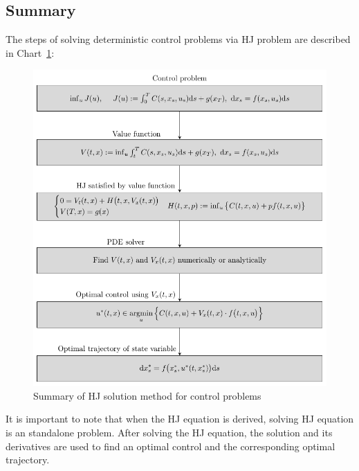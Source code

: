 \documentclass[11pt]{book}
\begin{document}
\subsection{Summary}
The steps of solving deterministic control problems via HJ problem are described in Chart~\ref{fig:chart1}:
\begin{figure}[ht!]
    \centering
    \includegraphics[height=0.5\textheight]{Control_lecture_notes/Figs/HJ_chart.pdf}
    \caption{Summary of HJ solution method for control problems}
    \label{fig:chart1}
\end{figure}
It is important to note that when the HJ equation is derived, solving HJ equation is an standalone problem. After solving the HJ equation, the solution and its derivatives are used to find an optimal control and the corresponding optimal trajectory.
\end{document}
